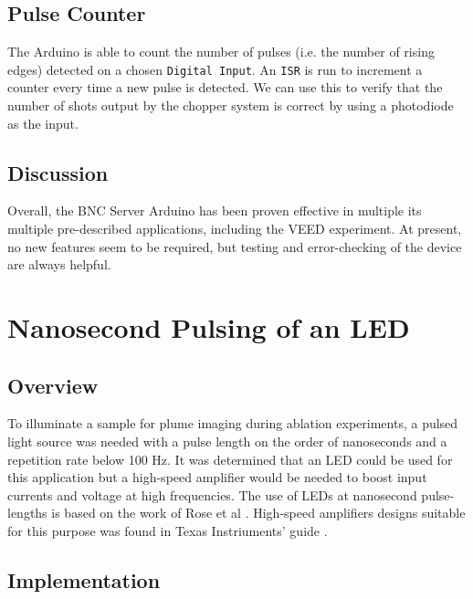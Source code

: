 \documentclass{article}
\begin{document}
        \subsection{Pulse Counter} \label{arduino_pulses}
        
        The Arduino is able to count the number of pulses (i.e. the number of rising edges) detected on a chosen \texttt{Digital Input}. An \texttt{ISR} is run to increment a counter every time a new pulse is detected. We can use this to verify that the number of shots output by the chopper system is correct by using a photodiode as the input.
        
        \subsection{Discussion}
        
        Overall, the BNC Server Arduino has been proven effective in multiple its multiple pre-described applications, including the VEED experiment. At present, no new features seem to be required, but testing and error-checking of the device are always helpful.
        
        
\section{Nanosecond Pulsing of an LED} \label{nanosecond_circuit}

    \subsection{Overview} \label{nanosecond_overview}
    
    To illuminate a sample for plume imaging during ablation experiments, a pulsed light source was needed with a pulse length on the order of nanoseconds and a repetition rate below 100 Hz. It was determined that an LED could be used for this application but a high-speed amplifier would be needed to boost input currents and voltage at high frequencies. The use of LEDs at nanosecond pulse-lengths is based on the work of Rose et al \cite{nanosecond_led}. High-speed amplifiers designs suitable for this purpose was found in Texas Instriuments' guide \cite{high_speed_amps}.
    
    \subsection{Implementation} \label{nanosecond_implementation}
    
\end{document}
